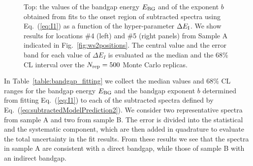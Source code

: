 \begin{figure}[t]
\begin{centering}
  \caption{Top: the values of the bandgap energy $E_{\rm BG}$ and of the exponent $b$
  obtained from fits to the onset
  region of subtracted spectra using Eq.~(\ref{eq:I1}) as a function
  of the hyper-parameter $\Delta E_{\rm I}$.
  We show results for locations \#4 (left)
  and \#5 (right panels) from Sample A indicated in Fig.~\ref{fig:ws2positions}.
  The central value and the error band for each value of $\Delta E_I$ is evaluated
  as the median and the 68\% CL interval over the $N_{\rm rep}=500$ Monte Carlo replicas.
  }
\label{fig:bvalues}
\end{centering}
\end{figure}

In Table~\ref{table:bandgap_fitting} we collect
 the median values and 68\% CL ranges for the bandgap energy $E_{\rm BG}$
 and the bandgap exponent $b$ determined from fitting Eq.~(\ref{eq:I1}) to each of the subtracted
 spectra defined by Eq.~(\ref{eq:subtractedModelPrediction2}).
 We consider two representative spectra from sample A and two
 from sample B. 
 The error is divided into the statistical and the systematic component, which are
 then added in quadrature to evaluate the total uncertainty in the fit results. 
 From these results we see that the spectra in sample A are consistent with a direct bandgap,
 while those of sample B with an indirect bandgap.

